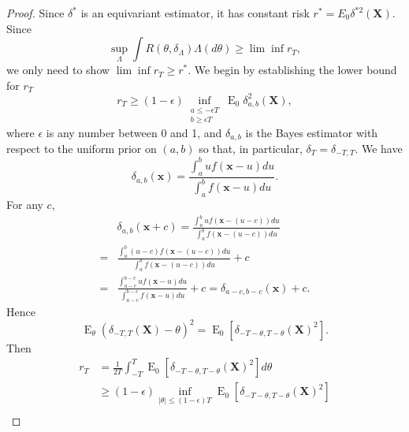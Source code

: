 \documentclass{article}
\DeclareMathOperator{\myE}{E}
\theoremstyle{plain}
\theoremstyle{definition}
\begin{document}
\begin{proof}
    Since $\delta^*$ is an equivariant estimator, it has constant risk $r^*=E_0 \delta^{*2} (\mathbf{X})$.
    Since
        \begin{equation*}
        \sup_{\Lambda} \int R(\theta,\delta_\Lambda)\Lambda(d\theta)
 \geq\lim\inf r_T,
        \end{equation*}
        we only need to show $\lim\inf r_T\geq r^*$.
        We begin by establishing the lower bound for $r_T$
        \begin{equation}\label{eqd38}
            r_T\geq (1-\epsilon)\inf_{\substack{ a\leq -\epsilon T\\b\geq \epsilon T}} \myE_0 \delta_{a,b}^2(\mathbf{X}),
        \end{equation}
        where $\epsilon$ is any number between 0 and 1, and $\delta_{a,b}$ is the Bayes estimator with respect to the uniform prior on $(a,b)$ so that, in particular, $\delta_T=\delta_{-T,T}$.
        We have
        \begin{equation*}
            \delta_{a,b}(\mathbf{x})=\frac{\int_{a}^b uf(\mathbf{x}-u)du}{\int_a^b f(\mathbf{x}-u)du}.
        \end{equation*}
        For any $c$,
        \begin{equation*}
            \begin{aligned}
                &\delta_{a,b}(\mathbf{x}+c)
            =\frac{\int_{a}^b uf(\mathbf{x}-(u-c))du}{\int_a^b f(\mathbf{x}-(u-c))du}\\
                =&\frac{\int_{a}^b (u-c)f(\mathbf{x}-(u-c))du}{\int_a^b f(\mathbf{x}-(u-c))du}+c\\
                =&\frac{\int_{a-c}^{b-c} u f(\mathbf{x}-u)du}{\int_{a-c}^{b-c} f(\mathbf{x}-u)du}+c=
                \delta_{a-c,b-c}(\mathbf{x})+c.
            \end{aligned}
        \end{equation*}
Hence
        \begin{equation*}
            \myE_\theta(\delta_{-T,T}(\mathbf{X})-\theta)^2
            =\myE_0[\delta_{-T-\theta,T-\theta}(\mathbf{X})^2].
        \end{equation*}
        Then
        \begin{equation*}
            \begin{aligned}
                r_T&=\frac{1}{2T}\int_{-T}^T\myE_0[\delta_{-T-\theta,T-\theta}(\mathbf{X})^2]d\theta\\
                &\geq
                (1-\epsilon)\inf_{|\theta|\leq (1-\epsilon)T}\myE_0[\delta_{-T-\theta,T-\theta}(\mathbf{X})^2]\\

\end{aligned}
\end{equation*}
\end{proof}
\end{document}
